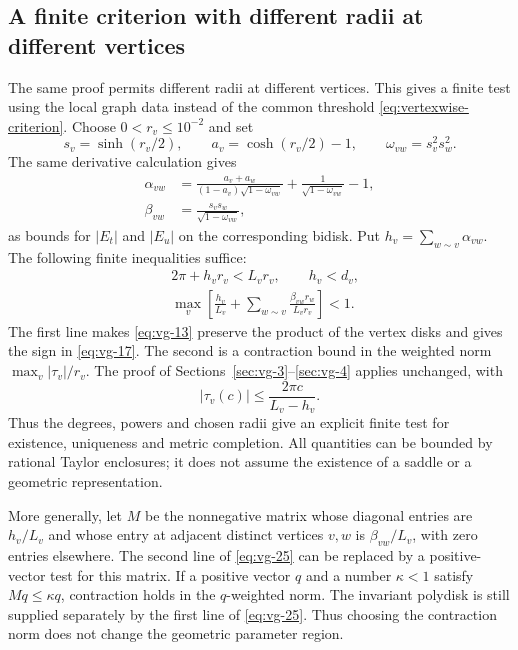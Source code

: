 \subsection{A finite criterion with different radii at different vertices}\label{sec:vg-5}

The same proof permits different radii at different vertices. This
gives a finite test using the local graph data instead of the common
threshold \eqref{eq:vertexwise-criterion}. Choose
\(0<r_v\le10^{-2}\) and set
\begin{equation}\label{eq:vg-23}
s_v=\sinh(r_v/2),\qquad a_v=\cosh(r_v/2)-1,\qquad
 \omega_{vw}=s_v^2s_w^2.
\end{equation} The same derivative calculation gives \begin{equation}\label{eq:vg-24}
\begin{split}
 \alpha_{vw}
 &=\frac{a_v+a_w}{(1-a_v)\sqrt{1-\omega_{vw}}}
          +\frac1{\sqrt{1-\omega_{vw}}}-1,\\
 \beta_{vw}
 &=\frac{s_vs_w}{\sqrt{1-\omega_{vw}}},
 \end{split}
\end{equation} as bounds for \(|E_t|\) and \(|E_u|\) on the corresponding bidisk. Put \(h_v=\sum_{w\sim v}\alpha_{vw}\). The following finite inequalities suffice: \begin{equation}\label{eq:vg-25}
\begin{split}
 &2\pi+h_vr_v<L_vr_v,\qquad h_v<d_v,\\
 &\max_v\left[
       \frac{h_v}{L_v}
       +\sum_{w\sim v}\frac{\beta_{vw}r_w}{L_vr_v}\right]<1.
 \end{split}
\end{equation} The first line makes \eqref{eq:vg-13} preserve the product of the vertex disks and gives the sign in \eqref{eq:vg-17}. The second is a contraction bound in the weighted norm \(\max_v|\tau_v|/r_v\). The proof of Sections~\ref{sec:vg-3}--\ref{sec:vg-4} applies unchanged, with \begin{equation}\label{eq:vg-26}
|\tau_v(c)|\le\frac{2\pi c}{L_v-h_v}.
\end{equation} Thus the degrees, powers and chosen radii give an explicit finite
test for existence, uniqueness and metric completion. All quantities can be bounded by rational Taylor enclosures; it does not assume the existence of a saddle or a geometric representation.

More generally, let $M$ be the nonnegative matrix whose diagonal
entries are $h_v/L_v$ and whose entry at adjacent distinct vertices
$v,w$ is $\beta_{vw}/L_v$, with zero entries elsewhere. The
second line of \eqref{eq:vg-25} can be replaced by a positive-vector
test for this matrix. If a positive vector \(q\) and a number \(\kappa<1\) satisfy \(Mq\le\kappa q\), contraction holds in the \(q\)-weighted norm. The invariant polydisk is still supplied separately by the first line of \eqref{eq:vg-25}. Thus choosing the contraction norm does not change the geometric parameter region.
